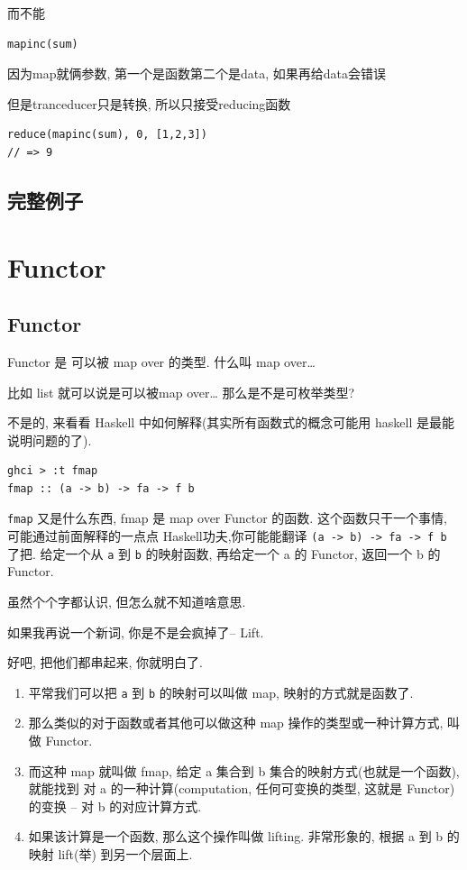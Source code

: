\documentclass[a5paper]{book}
\begin{document}
而不能
\begin{verbatim}
mapinc(sum)
\end{verbatim}
因为map就俩参数, 第一个是函数第二个是data, 如果再给data会错误

但是tranceducer只是转换, 所以只接受reducing函数
\begin{verbatim}
reduce(mapinc(sum), 0, [1,2,3])
// => 9
\end{verbatim}

\chapter{完整例子}
\label{sec:orgheadline30}

\part{Functor}
\label{sec:orgheadline35}

\chapter{Functor}
\label{sec:orgheadline32}

Functor 是 可以被 map over 的类型. 什么叫 map over\ldots{}

比如 list 就可以说是可以被map over\ldots{} 那么是不是可枚举类型?

不是的, 来看看 Haskell 中如何解释(其实所有函数式的概念可能用 haskell
是最能说明问题的了).

\begin{verbatim}
ghci > :t fmap
fmap :: (a -> b) -> fa -> f b
\end{verbatim}

\texttt{fmap} 又是什么东西, fmap 是 map over Functor 的函数.
这个函数只干一个事情, 可能通过前面解释的一点点
Haskell功夫,你可能能翻译 \texttt{(a -> b) -> fa -> f b} 了把. 给定一个从 \texttt{a} 到 \texttt{b}
的映射函数, 再给定一个 a 的 Functor, 返回一个 b 的 Functor.

虽然个个字都认识, 但怎么就不知道啥意思.

如果我再说一个新词, 你是不是会疯掉了-- Lift.

好吧, 把他们都串起来, 你就明白了. 
\begin{enumerate}
\item 平常我们可以把 \texttt{a} 到 \texttt{b} 的映射可以叫做 map, 映射的方式就是函数了.
\item 那么类似的对于函数或者其他可以做这种 map 操作的类型或一种计算方式, 叫做 Functor.
\item 而这种 map 就叫做 fmap, 给定 a 集合到 b 集合的映射方式(也就是一个函数), 就能找到 对 a 的一种计算(computation, 任何可变换的类型, 这就是 Functor) 的变换 -- 对 b 的对应计算方式.
\item 如果该计算是一个函数, 那么这个操作叫做 lifting. 非常形象的, 根据 a 到 b 的映射 lift(举) 到另一个层面上.
\end{enumerate}
\end{document}
